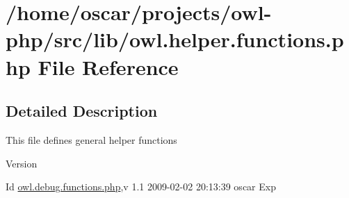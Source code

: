 \section{/home/oscar/projects/owl-\/php/src/lib/owl.helper.functions.php File Reference}
\label{owl_8helper_8functions_8php}


\subsection{Detailed Description}
This file defines general helper functions \begin{DoxyVersion}{Version}

\end{DoxyVersion}
\begin{DoxyParagraph}{Id}
\hyperlink{owl_8debug_8functions_8php}{owl.debug.functions.php},v 1.1 2009-\/02-\/02 20:13:39 oscar Exp 
\end{DoxyParagraph}

